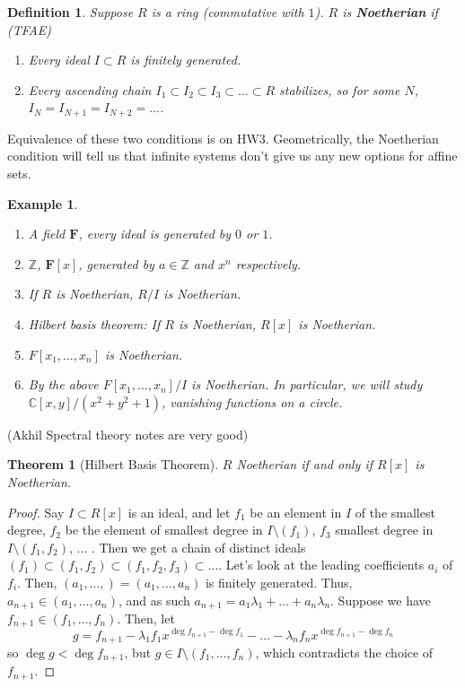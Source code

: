 \documentclass[12pt]{article}
\newcommand{\F}{\mathbf{F}}
\newcommand{\C}{\mathbb{C}}
\newcommand{\Z}{\mathbb{Z}}
\newtheorem{definition}{Definition}
\newtheorem{example}[]{Example}
\newtheorem{theorem}{Theorem}
\begin{document}
    \begin{definition}
        Suppose $R$ is a ring (commutative with $1$). $R$ is \textbf{Noetherian} if (TFAE)
        \begin{enumerate}
            \item Every ideal $I \subset R$ is finitely generated. 
            \item Every ascending chain $I_1 \subset I_2 \subset I_3 \subset \dots \subset R$ stabilizes, so for some $N$, $I_{N} = I_{N+1} = I_{N+2} = \dots$. 
        \end{enumerate} 
    \end{definition}
    Equivalence of these two conditions is on HW3. Geometrically, the Noetherian condition will tell us that infinite systems don't give us any new options for affine sets. \par 
    \begin{example}
        \begin{enumerate}
            \item A field $\F$, every ideal is generated by $0$ or $1$. 
            \item $\Z$, $\F[x]$, generated by $a \in \Z$ and $x^n$ respectively. 
            \item If $R$ is Noetherian, $R/I$ is Noetherian. 
            \item Hilbert basis theorem: If $R$ is Noetherian, $R[x]$ is Noetherian. 
            \item $F[x_1, \dots, x_n]$ is Noetherian. 
            \item By the above $F[x_1, \dots, x_n]/I$ is Noetherian. In particular, we will study $\C[x, y]/(x^2 + y^2 + 1)$, vanishing functions on a circle. 
        \end{enumerate}
    \end{example}
    (Akhil Spectral theory notes are very good)\par 
    \begin{theorem}
        [Hilbert Basis Theorem] $R$ Noetherian if and only if $R[x]$ is Noetherian. 
    \end{theorem}
    \begin{proof}
        Say $I \subset R[x]$ is an ideal, and let $f_1$ be an element in $I$ of the smallest degree, $f_2$ be the element of smallest degree in $I \setminus (f_1)$, $f_3$ smallest degree in $I \setminus (f_1, f_2)$, ... . Then we get a chain of distinct ideals $(f_1) \subset (f_1, f_2) \subset (f_1, f_2, f_3) \subset \dots$. Let's look at the leading coefficients $a_i$ of $f_i$. Then, $(a_1, \dots, ) = (a_1, \dots, a_n)$ is finitely generated. Thus, $a_{n+1} \in (a_1, \dots, a_n)$, and as such $a_{n+1} = a_1\lambda_1 + \dots + a_n\lambda_n$. Suppose we have $f_{n+1} \in (f_1, \dots, f_n)$. Then, let 
        $$g = f_{n+1} - \lambda_1 f_1 x^{\deg f_{n+1} - \deg f_1} - \dots - \lambda_n f_n x^{\deg f_{n+1} - \deg f_n}$$
        so $\deg g < \deg f_{n+1}$, but $g \in I \setminus (f_1, \dots, f_n)$, which contradicts the choice of $f_{n+1}$. 
    \end{proof}
    
\end{document}
